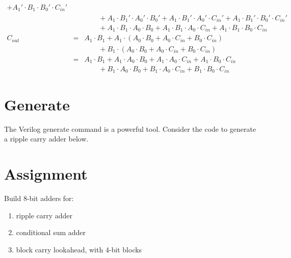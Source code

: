 \begin{example}
{\begin{eqnarray}
          + A_1' \cdot B_1 \cdot B_0'\cdot C_{in}' \\
    & & \qquad
          + A_1 \cdot B_1' \cdot A_0'\cdot B_0' + A_1 \cdot B_1' \cdot A_0'\cdot C_{in}'
          + A_1 \cdot B_1' \cdot B_0'\cdot C_{in}' \\
    & & \qquad
          + A_1 \cdot B_1 \cdot A_0\cdot B_0 + A_1 \cdot B_1 \cdot A_0\cdot C_{in}
           + A_1 \cdot B_1 \cdot B_0\cdot C_{in} \\
C_{out} & = & A_1 \cdot B_1 + A_1 \cdot (A_0\cdot B_0 + A_0\cdot C_{in} + B_0\cdot C_{in}) \\
   & & \qquad + B_1 \cdot (A_0\cdot B_0 + A_0\cdot C_{in} + B_0\cdot C_{in}) \\
    & = & A_1 \cdot B_1 + A_1 \cdot A_0\cdot B_0 + A_1 \cdot A_0\cdot C_{in} + A_1 \cdot B_0\cdot C_{in} \\
   & & \qquad + B_1 \cdot A_0\cdot B_0 + B_1 \cdot A_0\cdot C_{in} + B_1 \cdot B_0\cdot C_{in}
\end{eqnarray}
}
\end{example}

\section{Generate}

The Verilog generate command is a powerful tool.  Consider the code to generate a ripple carry adder below.



\section{Assignment}

Build 8-bit adders for:
\begin{enumerate}
\item ripple carry adder
\item conditional sum adder
\item block carry lookahead, with 4-bit blocks
\end{enumerate}